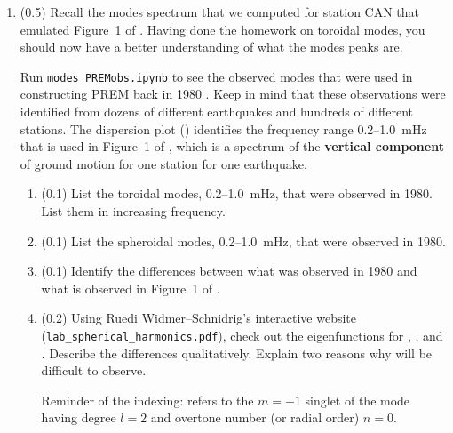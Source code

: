 \documentclass[11pt,titlepage,fleqn]{article}
\newcommand{\tfilelab}{{\tt lab\_sumatraB.ipynb}}
\begin{document}
\begin{enumerate}
\item (0.5) Recall the modes spectrum that we computed for station CAN that emulated Figure~1 of \citet{Park2005}. Having done the homework on toroidal modes, you should now have a better understanding of what the modes peaks are.

Run \verb+modes_PREMobs.ipynb+ to see the observed modes that were used in constructing PREM back in 1980 \citep{PREM}. Keep in mind that these observations were identified from dozens of different earthquakes and hundreds of different stations.
The dispersion plot () identifies the frequency range 0.2--1.0~mHz that is used in Figure~1 of \citet{Park2005}, which is a spectrum of the {\bf vertical component} of ground motion for one station for one earthquake.
%
\begin{enumerate}
\item (0.1) List the toroidal modes, 0.2--1.0~mHz, that were observed in 1980. \\
List them in increasing frequency.
\item (0.1) List the spheroidal modes, 0.2--1.0~mHz, that were observed in 1980.
\item (0.1) Identify the differences between what was observed in 1980 and what is observed in Figure~1 of \citet{Park2005}.
\item (0.2) Using Ruedi Widmer--Schnidrig's interactive website (\verb+lab_spherical_harmonics.pdf+), check out the eigenfunctions for , , and . Describe the differences qualitatively. Explain two reasons why  will be difficult to observe.

Reminder of the indexing:  refers to the $m=-1$ singlet of the mode having degree $l=2$ and overtone number (or radial order) $n=0$.
\end{enumerate}




\end{enumerate}
\end{document}
